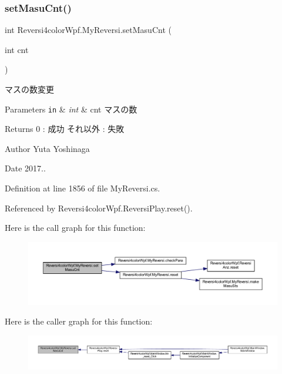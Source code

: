 \subsubsection{\texorpdfstring{set\+Masu\+Cnt()}{setMasuCnt()}}
{\footnotesize\ttfamily int Reversi4color\+Wpf.\+My\+Reversi.\+set\+Masu\+Cnt (\begin{DoxyParamCaption}\item[{int}]{cnt }\end{DoxyParamCaption})}



マスの数変更 


\begin{DoxyParams}[1]{Parameters}
\mbox{\tt in}  & {\em int} & cnt マスの数 \\
\hline
\end{DoxyParams}
\begin{DoxyReturn}{Returns}
0 \+: 成功 それ以外 \+: 失敗 
\end{DoxyReturn}
\begin{DoxyAuthor}{Author}
Yuta Yoshinaga 
\end{DoxyAuthor}
\begin{DoxyDate}{Date}
2017.. 
\end{DoxyDate}


Definition at line 1856 of file My\+Reversi.\+cs.



Referenced by Reversi4color\+Wpf.\+Reversi\+Play.\+reset().

Here is the call graph for this function\+:
\nopagebreak
\begin{figure}[H]
\begin{center}
\leavevmode
\includegraphics[width=350pt]{class_reversi4color_wpf_1_1_my_reversi_a37c57a49d2f80c94dd0eb003de0328d5_cgraph}
\end{center}
\end{figure}
Here is the caller graph for this function\+:
\nopagebreak
\begin{figure}[H]
\begin{center}
\leavevmode
\includegraphics[width=350pt]{class_reversi4color_wpf_1_1_my_reversi_a37c57a49d2f80c94dd0eb003de0328d5_icgraph}
\end{center}
\end{figure}
\mbox{\label{class_reversi4color_wpf_1_1_my_reversi_a6d87b374741e3548284d8effa0c7e0fd}} 

